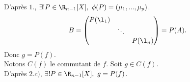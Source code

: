 \documentclass[11pt]{article}
\begin{document}
\begin{exercice}{}{}
\begin{equation*}
    \end{equation*}
    D'après $1.$, $\exists!P\in\R_{n-1}[X], ~ \phi(P)=(\mu_1,...,\mu_p)$.
    \begin{equation*}
        B = \begin{pmatrix}P(\l_1) & & \\ & \ddots & \\ & & P(\l_n) \end{pmatrix} = P(A).
    \end{equation*}
    Donc $g=P(f)$.\\
     Notons $C(f)$ le commutant de $f$. Soit $g\in C(f)$.\\
    D'après $2.c)$, $\exists ! P\in\R_{n-1}[X], ~ g=P(f)$.
\end{exercice}

\pagebreak
\end{document}
